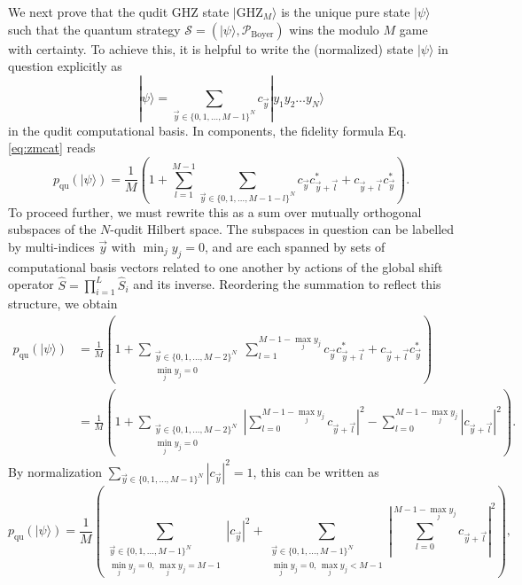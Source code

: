\documentclass[prb,twocolumn,showpacs,amssymb,superscriptaddress]{revtex4-2}
\begin{document}
We next prove that the qudit GHZ state $|\mathrm{GHZ}_M\rangle$ is the unique pure state $|\psi\rangle$ such that the quantum strategy $\mathcal{S} = (|\psi\rangle, \mathcal{P}_{\mathrm{Boyer}})$ wins the modulo $M$ game with certainty. To achieve this, it is helpful to write the (normalized) state $|\psi\rangle$ in question explicitly as
\begin{equation}
|\psi\rangle = \sum_{\vec{y} \in \{0,1,\ldots,M-1\}^N} c_{\vec{y}} |y_1 y_2\ldots y_N\rangle
\end{equation}
in the qudit computational basis. In components, the fidelity formula Eq. \eqref{eq:zmcat} reads
\begin{equation}
p_{\mathrm{qu}}(|\psi\rangle) = \frac{1}{M}\left(1 + \sum_{l=1}^{M-1} \sum_{\vec{y} \in \{0,1,\ldots,M-1-l\}^N} c_{\vec{y}}c_{\vec{y}+\vec{l}}^* + c_{\vec{y}+\vec{l}}c_{\vec{y}}^*\right).
\end{equation}
To proceed further, we must rewrite this as a sum over mutually orthogonal subspaces of the $N$-qudit Hilbert space. The subspaces in question can be labelled by multi-indices $\vec{y}$ with $\min_j y_j = 0$, and are each spanned by sets of computational basis vectors related to one another by actions of the global shift operator $\hat{S} = \prod_{i=1}^L \hat{S}_i$ and its inverse. Reordering the summation to reflect this structure, we obtain
\begin{align}
\nonumber p_{\mathrm{qu}}(|\psi\rangle) &= \frac{1}{M}\left(1 + \sum_{\substack{\vec{y} \in \{0,1,\ldots,M-2\}^N \\ \min_j y_j = 0}} \sum_{l=1}^{M-1-\max_j y_j} c_{\vec{y}}c_{\vec{y}+\vec{l}}^* + c_{\vec{y}+\vec{l}}c_{\vec{y}}^*\right) \\
&= \frac{1}{M}\left(1 + \sum_{\substack{\vec{y} \in \{0,1,\ldots,M-2\}^N \\ \min_j y_j = 0}} \left|\sum_{l=0}^{M-1-\max_j y_j} c_{\vec{y}+\vec{l}}\right|^2 - \sum_{l=0}^{M-1-\max_j y_j} |c_{\vec{y}+\vec{l}}|^2\right).
\end{align}
By normalization $\sum_{\vec{y}\in \{0,1,\ldots,M-1\}^N} |c_{\vec{y}}|^2 = 1$, this can be written as
\begin{equation}
p_{\mathrm{qu}}(|\psi\rangle) = \frac{1}{M}\left(\sum_{\substack{\vec{y} \in \{0,1,\ldots,M-1\}^N \\ \min_j y_j = 0, \,\max_j y_j = M-1}}| c_{\vec{y}}|^2 + \sum_{\substack{\vec{y} \in \{0,1,\ldots,M-1\}^N \\ \min_j y_j = 0,\, \max_j y_j < M-1}} \left|\sum_{l=0}^{M-1-\max_j y_j} c_{\vec{y}+\vec{l}}\right|^2\right),
\end{equation}
\end{document}
